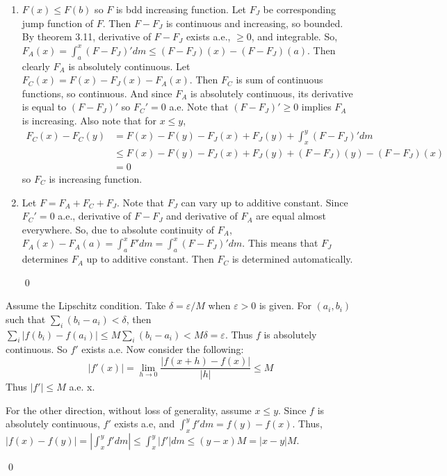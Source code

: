 \begin{problem}[3.24] \hfill
	\begin{enumerate}[label = (\alph*)]
		\item $F(x) \leq F(b)$ so $F$ is bdd increasing function. Let $F_J$ be corresponding jump function of $F$.
			Then $F - F_J$ is continuous and increasing, so bounded.
			By theorem 3.11, derivative of $F-F_J$ exists a.e., $\geq 0$, and integrable.
			So, $F_A(x) = \int_a^x (F-F_J)'dm \leq (F-F_J)(x) - (F-F_J)(a)$. Then clearly $F_A$ is absolutely continuous.
			Let $F_C(x) = F(x) - F_J(x) - F_A(x)$.
			Then $F_C$ is sum of continuous functions, so continuous.
			And since $F_A$ is absolutely continuous, its derivative is equal to $(F-F_J)'$ so $F_C' = 0$ a.e.
			Note that $(F-F_J)' \geq 0$ implies $F_A$ is increasing.
			Also note that for $x\leq y$,
		\[
			\begin{split}
				F_C(x) - F_C(y)
				& = F(x) - F(y) -F_J(x) +F_J(y) + \int_x^y (F-F_J)'dm\\
				& \leq F(x) - F(y) -F_J(x) +F_J(y) + (F-F_J)(y) - (F-F_J)(x) \\
				& = 0
			\end{split}
		\]
		so $F_C$ is increasing function.

	\item Let $F = F_A + F_C + F_J$. Note that $F_J$ can vary up to additive constant. Since $F_C' = 0$ a.e., derivative of $F- F_J$ and derivative of $F_A$ are equal almost everywhere.
		So, due to absolute continuity of $F_A$, $F_A(x) - F_A(a) = \int_a^x F' dm = \int_a^x (F-F_J)'dm$. This means that $F_J$ determines $F_A$ up to additive constant. Then $F_C$ is determined automatically.

		\qed
	\end{enumerate}
	
\end{problem}

\begin{problem}[3.32] \hfill

	Assume the Lipschitz condition. Take $\delta = \varepsilon /M$ when $\varepsilon>0$ is given.
	For $(a_i, b_i)$ such that $\sum_i (b_i - a_i) < \delta$,
	then $\sum_i |f(b_i) - f(a_i)| \leq M\sum_i (b_i - a_i) < M \delta = \varepsilon$. 
	Thus $f$ is absolutely continuous. So $f'$ exists a.e.
	Now consider the following:
	\[
		|f'(x)| = \lim_{h\rightarrow 0} \frac{|f(x+h)-f(x)|}{|h|} \leq M
	\]
	Thus $|f'| \leq M$ a.e. x.
	
	For the other direction, without loss of generality, assume $x\leq y$.
	Since $f$ is absolutely continuous, $f'$ exists a.e, and $\int_x^y f' dm = f(y) - f(x)$.
	Thus, $|f(x) - f(y) | = \left | \int_x^y f' dm \right | \leq \int_x^y |f'| dm \leq (y-x)M = |x-y|M$.

	\qed
\end{problem}
